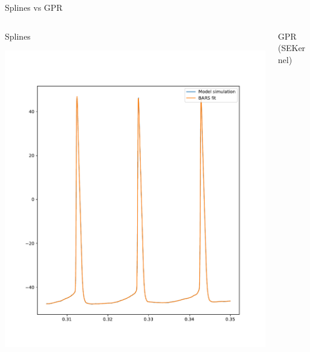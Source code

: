 \documentclass[presentation]{beamer}
\begin{document}
\begin{frame}[plain,label={sec:org4ebdf23}]{Splines vs GPR}
\begin{columns}
\begin{column}{0.5\columnwidth}
\begin{center}
Splines
\end{center}

\begin{center}
\includegraphics[width=1.1\textwidth]{./BARS.pdf}
\end{center}
\end{column}



\begin{column}{0.5\columnwidth}
\begin{center}
GPR (SEKernel)
\end{center}


\end{column}
\end{columns}
\end{frame}
\end{document}
